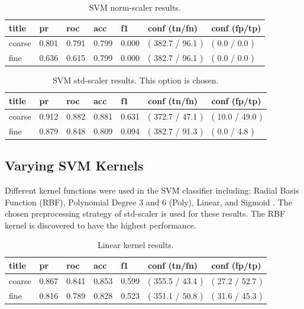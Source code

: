 \documentclass[ms]{nuthesis}
\begin{document}
\FloatBarrier
\begin{table}[H]
\centering
\caption{SVM norm-scaler results.}
\label{tab:SVMNorm}
\begin{tabular}{|l||l||l||l||l||l||l|}\toprule
title & pr & roc & acc & f1 & conf (tn/fn) & conf (fp/tp) \\ \midrule
coarse & 0.801 & 0.791 & 0.799 & 0.000 & ( 382.7 / 96.1 ) & ( 0.0 / 0.0 ) \\
fine & 0.636 & 0.615 & 0.799 & 0.000 & ( 382.7 / 96.1 ) & ( 0.0 / 0.0 ) \\ \bottomrule
\end{tabular}
\end{table}
\FloatBarrier

\FloatBarrier
\begin{table}[H]
\centering
\caption{SVM std-scaler results. This option is chosen.}
\label{tab:SVMStandard}
\begin{tabular}{|l||l||l||l||l||l||l|}\toprule
title & pr & roc & acc & f1 & conf (tn/fn) & conf (fp/tp) \\ \midrule
coarse & 0.912 & 0.882 & 0.881 & 0.631 & ( 372.7 / 47.1 ) & ( 10.0 / 49.0 ) \\
fine & 0.879 & 0.848 & 0.809 & 0.094 & ( 382.7 / 91.3 ) & ( 0.0 / 4.8 ) \\ \bottomrule
\end{tabular}
\end{table}
\FloatBarrier


\subsection{Varying SVM Kernels}
\par Different kernel functions were used in the SVM classifier
including: Radial Basis Function (RBF), Polynomial
Degree 3 and 6 (Poly), Linear, and Sigmoid \cite{scikit-learn}. The
chosen preprocessing strategy of
std-scaler is used for these results. The RBF kernel is discovered to have the
highest performance.



\FloatBarrier
\begin{table}[H]
\centering
\caption{Linear kernel results.}
\label{tab:Linear}
\begin{tabular}{|l||l||l||l||l||l||l|}\toprule
title & pr & roc & acc & f1 & conf (tn/fn) & conf (fp/tp) \\ \midrule
coarse & 0.867 & 0.841 & 0.853 & 0.599 & ( 355.5 / 43.4 ) & ( 27.2 / 52.7 ) \\
fine & 0.816 & 0.789 & 0.828 & 0.523 & ( 351.1 / 50.8 ) & ( 31.6 / 45.3 ) \\ \bottomrule
\end{tabular}
\end{table}
\FloatBarrier
\end{document}
